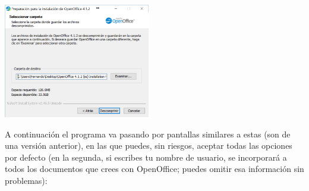 \documentclass[10pt,a4paper]{article}
\newcounter {cont01}
\begin{document}
    \begin{center}
    \includegraphics[height=5cm]{../fig/Tut00-OpenOffice-05-201605.png}
    \end{center}
A continuación el programa va pasando por pantallas similares a estas (son de una versión anterior), en las que puedes, 
sin riesgos, aceptar todas las opciones por defecto (en la segunda, si escribes tu nombre de usuario, se
incorporará a todos los documentos que crees con OpenOffice; puedes omitir esa información sin
problemas):
\end{document}
